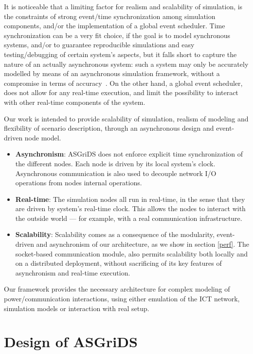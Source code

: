 \documentclass[conference]{IEEEtran}
\begin{document}
It is noticeable that a limiting factor for realism and scalability of simulation, is the constraints of strong event/time synchronization among simulation components, and/or the implementation of a global event scheduler. Time synchronization can be a very fit choice, if the goal is to model synchronous systems, and/or to guarantee reproducible simulations and easy testing/debugging of certain system's aspects, but it falls short to capture the nature of an actually asynchronous system: such a system may only be accurately modelled by means of an asynchronous simulation framework, without a compromise in terms of accuracy~\cite{ghoshRoleModelingAsynchronous2002}. 
On the other hand, a global event scheduler, does not allow for any real-time execution, and limit the possibility to interact with other real-time components of the system.

Our work is intended to provide scalability of simulation, realism of modeling and flexibility of scenario description, through an asynchronous design and event-driven node model.
\begin{itemize}
	\item \textbf{Asynchronism}: ASGriDS does not enforce explicit time synchronization of the different nodes. Each node is driven by its local system's clock.
	Asynchronous communication is also used to decouple network I/O operations from nodes internal operations.
	\item \textbf{Real-time}: The simulation nodes all run in real-time, in the sense that they are driven by system's real-time clock. This allows the nodes to interact with the outside world --- for example, with a real communication infrastructure.
	\item \textbf{Scalability}: Scalability comes as a consequence of the modularity, event-driven and asynchronism of our architecture, as we show in section \ref{perf}.
	The socket-based communication module, also permits scalability both locally and on a distributed deployment, without sacrificing of its key features of asynchronism and real-time execution.
\end{itemize}

Our framework provides the necessary architecture for complex modeling of power/communication interactions, using either emulation of the ICT network, simulation models or interaction with real setup.

\section{Design of ASGriDS}\label{design}
\end{document}
